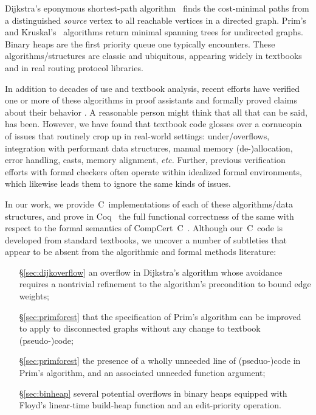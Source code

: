 Dijkstra's eponymous shortest-path algorithm~\cite{DBLP:journals/nm/Dijkstra59} finds
the cost-minimal paths from a distinguished \emph{source} vertex
to all reachable vertices in a directed graph. Prim's~\cite{prim2:prim} and Kruskal's~\cite{kruskal} algorithms return minimal spanning trees for undirected graphs.  Binary heaps are the first priority queue one typically encounters.
These algorithms/structures are classic and ubiquitous, appearing widely in textbooks~\cite{clrs,DBLP:books/daglib/0022194,heineman2008algorithms,rozen,kepnergilbert,sedgewick} and in real routing protocol libraries.

In addition to decades of use and textbook analysis, recent efforts have verified one or more of these algorithms in proof
assistants and formally proved claims about their behavior \cite{chen2003dijkstra,Moore2005,arthur,DBLP:journals/afp/LammichN19,DBLP:conf/ictac/Guttmann16}.  A reasonable person might think that all
that can be said, has been.  However, we have found that
textbook code glosses over a cornucopia
of issues that routinely crop up in real-world settings: under/overflows, integration with performant data structures, manual memory (de-)allocation,
error handling, casts, memory alignment, \emph{etc.} Further, previous verification efforts with formal checkers often operate
within idealized formal environments, which likewise leads them to ignore the same kinds of issues.

In our work, we provide~C~implementations of each of these algorithms/data structures, and prove in Coq~\cite{Coq} the full functional correctness of the same with respect to
the formal semantics of CompCert~C~\cite{leroy:compcert}.  Although our~C~code is developed from standard textbooks, we uncover a number of subtleties
that appear to be absent from the algorithmic and formal methods literature:

\begin{itemize}
\item[\S\ref{sec:dijkoverflow}] an overflow in Dijkstra's algorithm whose avoidance requires a nontrivial refinement to the algorithm's precondition to bound edge weights;
\item[\S\ref{sec:primforest}] that the specification of Prim's algorithm can be improved to apply to disconnected graphs without any change to textbook (pseudo-)code;
\item[\S\ref{sec:primforest}] the presence of a wholly unneeded line of (pseduo-)code in Prim's algorithm, and an associated unneeded function argument;
\item[\S\ref{sec:binheap}] several potential overflows in binary heaps equipped with Floyd's linear-time build-heap function and an edit-priority operation.
\end{itemize}

